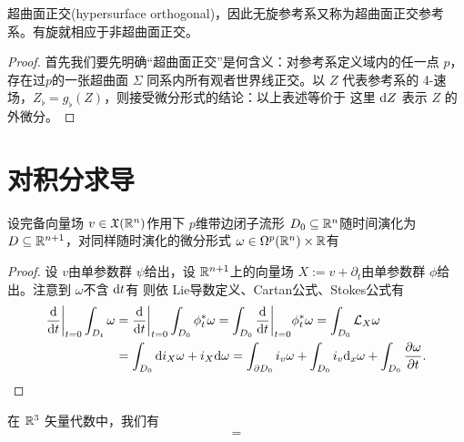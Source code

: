 \begin{theorem}
    超曲面正交(hypersurface orthogonal)，因此无旋参考系又称为超曲面正交参考系。有旋就相应于非超曲面正交。
\end{theorem}
\begin{proof}
    首先我们要先明确“超曲面正交”是何含义：对参考系定义域内的任一点 $p$，存在过$p$的一张超曲面 $\Sigma$ 同系内所有观者世界线正交。以 $Z$ 代表参考系的 4-速场，$Z_\flat=g_\flat(Z)$，则接受微分形式的结论：以上表述等价于
    这里 $\dd Z$ 表示 $Z$ 的外微分。
\end{proof}

\section{对积分求导}

\begin{theorem}
    设完备向量场 $v\in\mathfrak X(\mathbb{R}^n)$作用下 $p$维带边闭子流形 $D_0\subseteq\mathbb{R}^n$随时间演化为 $D\subseteq\mathbb{R}^{n+1}$，对同样随时演化的微分形式 $\omega\in\Omega^p(\mathbb{R}^n)\times\mathbb{R}$有 
\end{theorem}
\begin{proof}
    设 $v$由单参数群 $\psi$给出，设 $\mathbb{R}^{n+1}$上的向量场 $X:=v+\partial_t$由单参数群 $\phi$给出。注意到 $\omega$不含 $\dd t$有
    则依 Lie导数定义、Cartan公式、Stokes公式有
    \begin{align*} \dv{t}\bigg|_{t=0}\int_{D_t}\omega&=\dv{t}\bigg|_{t=0}\int_{D_0}\phi_t^*\omega =\int_{D_0}\dv{t}\bigg|_{t=0}\phi_t^*\omega=\int_{D_0}\mathcal L_X\omega\\ &=\int_{D_0}\dd i_X\omega+i_X\dd\omega =\int_{\partial D_0}i_v\omega+\int_{D_0}i_v\dd_x\omega+\int_{D_0}\frac{\partial\omega}{\partial t}.\qedhere \end{align*}
\end{proof}

\begin{eg}
    在 $\mathbb{R}^3$ 矢量代数中，我们有
    \begin{align*}
        =
    \end{align*}
\end{eg}
